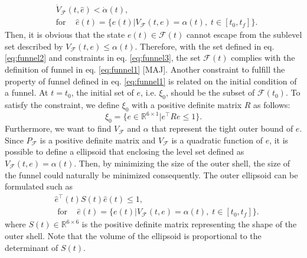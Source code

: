 \documentclass[letterpaper, 10 pt, conference]{ieeeconf}  %
\begin{document}
\begin{align}
&\dot{V}_\mathcal{F}(t,\hat{e}) < \dot{\alpha}(t), \label{eq:funnel3} \\
&\text{for }\;\;\;\hat{e}(t) = \{e(t)|V_\mathcal{F}(t,e) = \alpha(t),\;t\in[t_0,t_f]\}. \nonumber
\end{align}
Then, it is obvious that the state $e(t) \in \mathcal{F}(t)$ cannot escape from the sublevel set described by $V_\mathcal{F}(t,e) \leq \alpha(t)$.
Therefore, with the set defined in eq. \eqref{eq:funnel2} and constraints in eq. \eqref{eq:funnel3}, 
the set $\mathcal{F}(t)$ complies with the definition of funnel in eq. \eqref{eq:funnel1} [MAJ]. 
Another constraint to fulfill the property of funnel defined in eq. \eqref{eq:funnel1} is related on the initial condition of a funnel. 
At $t = t_0$, the initial set of $e$, i.e. $\xi_0$, should be the subset of $\mathcal{F}(t_0)$. 
To satisfy the constraint, we define $\xi_0$ with a positive definite matrix $R$ as follows:
\begin{equation}
\xi_0 = \{e \in \mathbb{R}^{6\times1}|e^\intercal R e \leq 1\}.
\end{equation} 
Furthermore, we want to find $V_\mathcal{F}$ and $\alpha$ that represent the tight outer bound of $e$. 
Since $P_\mathcal{F}$ is a positive definite matrix and $V_\mathcal{F}$ is a quadratic function of $e$, 
it is possible to define a ellipsoid that enclosing the level set defined as $V_\mathcal{F}(t,e) = \alpha(t)$.
Then, by minimizing the size of the outer shell, the size of the funnel could naturally be minimized consequently.
The outer ellipsoid can be formulated such as
\begin{align}
&\hat{e}^\intercal(t) S(t) \hat{e}(t) \leq 1,  \nonumber \\
&\text{ for }\;\;\;\hat{e}(t) = \{e(t)|V_\mathcal{F}(t,e) = \alpha(t),\;t \in [t_0,t_f]\}. \nonumber
\end{align}
where $S(t)\in \mathbb{R}^{6\times 6}$ is the positive definite matrix representing the shape of the outer shell. Note that the volume of the ellipsoid is proportional to the determinant of $S(t)$.
\end{document}
